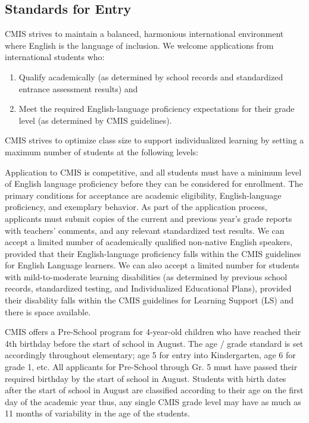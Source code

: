 \subsection{Standards for Entry}

CMIS strives to maintain a balanced, harmonious international environment where English is the language of inclusion.  We welcome applications from international students who:
\begin{enumerate}
\item Qualify academically (as determined by school records and standardized entrance assessment results) and
\item Meet the required English-language proficiency expectations for their grade level (as determined by CMIS guidelines).  
\end{enumerate}
CMIS strives to optimize class size to support individualized learning by setting a maximum number of students at the following levels:  



Application to CMIS is competitive, and all students must have a minimum level of English language proficiency before they can be considered for enrollment.  The primary conditions for acceptance are academic eligibility, English-language proficiency, and exemplary behavior.  As part of the application process, applicants must submit copies of the current and previous year’s grade reports with teachers' comments, and any relevant standardized test results.  We can accept a limited number of academically qualified non-native English speakers, provided that their English-language proficiency falls within the CMIS guidelines for English Language learners. We can also accept a limited number for students with mild-to-moderate learning disabilities (as determined by previous school records, standardized testing, and Individualized Educational Plans), provided their disability falls within the CMIS guidelines for Learning Support (LS) and there is space available.


CMIS offers a Pre-School program for 4-year-old children who have reached their 4th birthday before the start of school in August.  The age / grade standard is set accordingly throughout elementary; age 5 for entry into Kindergarten, age 6 for grade 1, etc.  All applicants for Pre-School through Gr. 5 must have passed their required birthday by the start of school in August.  Students with birth dates after the start of school in August are classified according to their age on the first day of the academic year thus, any single CMIS grade level may have as much as 11 months of variability in the age of the students.  


